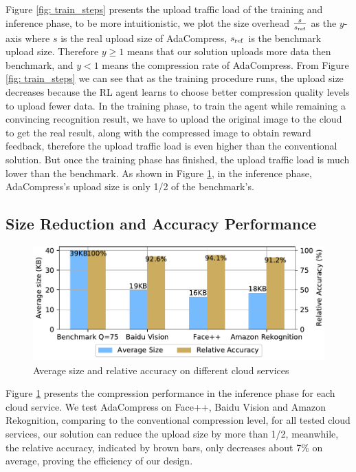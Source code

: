 Figure \ref{fig: train_steps} presents the upload traffic load of the training and inference phase, to be more intuitionistic, we plot the size overhead $ \frac{s}{s_{\rm ref}} $ as the $ y $-axis where $ s $ is the real upload size of AdaCompress, $ s_{\rm ref} $ is the benchmark upload size. Therefore $ y \geq 1 $ means that our solution uploads more data then benchmark, and $ y < 1 $ means the compression rate of AdaCompress. From Figure \ref{fig: train_steps} we can see that as the training procedure runs, the upload size decreases because the RL agent learns to choose better compression quality levels to upload fewer data. In the training phase, to train the agent while remaining a convincing recognition result, we have to upload the original image to the cloud to get the real result, along with the compressed image to obtain reward feedback, therefore the upload traffic load is even higher than the conventional solution. But once the training phase has finished, the upload traffic load is much lower than the benchmark. As shown in Figure \ref{fig: compress_performance}, in the inference phase, AdaCompress's upload size is only 1/2 of the benchmark's. %


\subsection{Size Reduction and Accuracy Performance}

\begin{figure}[htbp]
    \includegraphics[width=\linewidth]{figures/compress-performance.pdf}
    \caption{Average size and relative accuracy on different cloud services}
    \label{fig: compress_performance}
\end{figure}

Figure \ref{fig: compress_performance} presents the compression performance in the inference phase for each cloud service. We test AdaCompress on Face++, Baidu Vision and Amazon Rekognition, comparing to the conventional compression level, for all tested cloud services, our solution can reduce the upload size by more than 1/2, meanwhile, the relative accuracy, indicated by brown bars, only decreases about 7\% on average, proving the efficiency of our design. %

